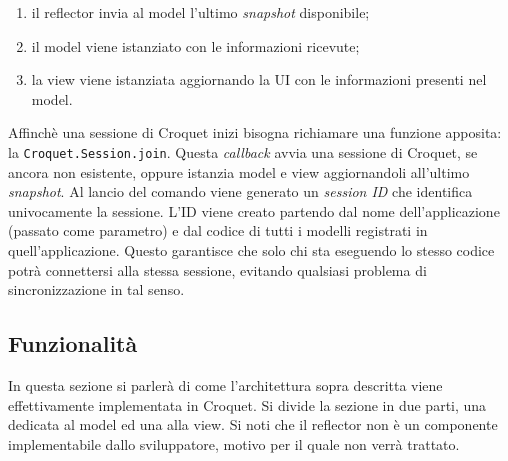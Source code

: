 \begin{enumerate}
    \item il reflector invia al model l'ultimo \textit{snapshot} disponibile;
    \item il model viene istanziato con le informazioni ricevute;
    \item la view viene istanziata aggiornando la UI con le informazioni presenti nel model.
\end{enumerate}
Affinchè una sessione di Croquet inizi bisogna richiamare una funzione apposita: la \texttt{Croquet.Session.join}. Questa \textit{callback} avvia una sessione di Croquet, se ancora 
non esistente, oppure istanzia model e view aggiornandoli all'ultimo \textit{snapshot}. Al lancio del comando viene generato un \textit{session ID} che identifica univocamente la 
sessione. L'ID viene creato partendo dal nome dell'applicazione (passato come parametro) e dal codice di tutti i modelli registrati in quell'applicazione. Questo garantisce che solo
chi sta eseguendo lo stesso codice potrà connettersi alla stessa sessione, evitando qualsiasi problema di sincronizzazione in tal senso.
\subsection{Funzionalità}\label{subsec:Croquet_funzionalita}
In questa sezione si parlerà di come l'architettura sopra descritta viene effettivamente implementata in Croquet. Si divide la sezione in due parti, una dedicata al model ed una alla
view. Si noti che il reflector non è un componente implementabile dallo sviluppatore, motivo per il quale non verrà trattato.\\
